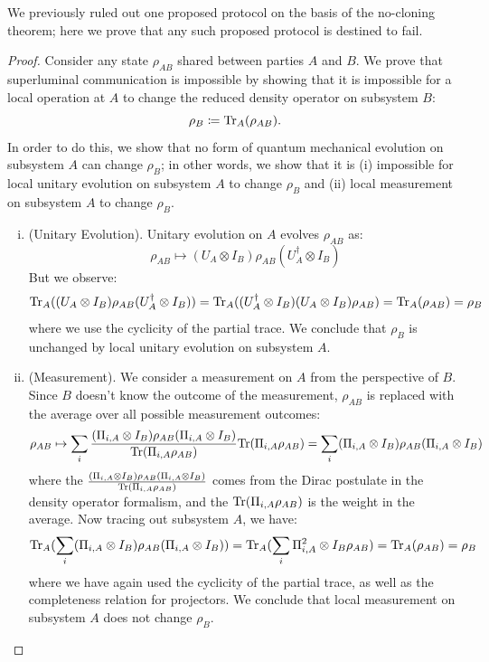 We previously ruled out one proposed protocol on the basis of the no-cloning theorem; here we prove that any such proposed protocol is destined to fail.

\begin{proof}
    Consider any state $\rho_{AB}$ shared between parties $A$ and $B$. We prove that superluminal communication is impossible by showing that it is impossible for a local operation at $A$ to change the reduced density operator on subsystem $B$:
    \begin{equation}
        \rho_B \coloneqq \mathrm{Tr}_A(\rho_{AB}).
    \end{equation}
    In order to do this, we show that no form of quantum mechanical evolution on subsystem $A$ can change $\rho_B$; in other words, we show that it is (i) impossible for local unitary evolution on subsystem $A$ to change $\rho_B$ and (ii) local measurement on subsystem $A$ to change $\rho_B$. 

    \begin{enumerate}[(i)]
        \item (Unitary Evolution). Unitary evolution on $A$ evolves $\rho_{AB}$ as:
        \begin{equation}
            \rho_{AB} \mapsto (U_A \otimes I_B)\rho_{AB}(U^\dag_A \otimes I_B)
        \end{equation}
        But we observe:
        \begin{equation}
            \mathrm{Tr}_A((U_A \otimes I_B)\rho_{AB}(U^\dag_A \otimes I_B)) = \mathrm{Tr}_A((U^\dag_A \otimes I_B)(U_A \otimes I_B)\rho_{AB}) = \mathrm{Tr}_A(\rho_{AB}) = \rho_B
        \end{equation}
        where we use the cyclicity of the partial trace. We conclude that $\rho_B$ is unchanged by local unitary evolution on subsystem $A$. 
        \item (Measurement). We consider a measurement on $A$ from the perspective of $B$. Since $B$ doesn't know the outcome of the measurement, $\rho_{AB}$ is replaced with the average over all possible measurement outcomes:
        \begin{equation}
            \rho_{AB} \mapsto \sum_i \frac{(\Pi_{i, A} \otimes I_B)\rho_{AB}(\Pi_{i, A} \otimes I_B)}{\mathrm{Tr}(\Pi_{i, A}\rho_{AB})}\mathrm{Tr}(\Pi_{i, A}\rho_{AB}) = \sum_i(\Pi_{i, A} \otimes I_B)\rho_{AB}(\Pi_{i, A} \otimes I_B)
        \end{equation}
        where the $\frac{(\Pi_{i, A} \otimes I_B)\rho_{AB}(\Pi_{i, A} \otimes I_B)}{\mathrm{Tr}(\Pi_{i, A}\rho_{AB})}$ comes from the Dirac postulate in the density operator formalism, and the $\mathrm{Tr}(\Pi_{i, A}\rho_{AB})$ is the weight in the average. Now tracing out subsystem $A$, we have:
        \begin{equation}
            \mathrm{Tr}_A(\sum_i(\Pi_{i, A} \otimes I_B)\rho_{AB}(\Pi_{i, A} \otimes I_B)) = \mathrm{Tr}_A(\sum_i \Pi_{i, A}^2 \otimes I_B \rho_{AB}) = \mathrm{Tr}_A(\rho_{AB}) = \rho_B
        \end{equation} 
        where we have again used the cyclicity of the partial trace, as well as the completeness relation for projectors. We conclude that local measurement on subsystem $A$ does not change $\rho_B$. 
    \end{enumerate}
\end{proof}


